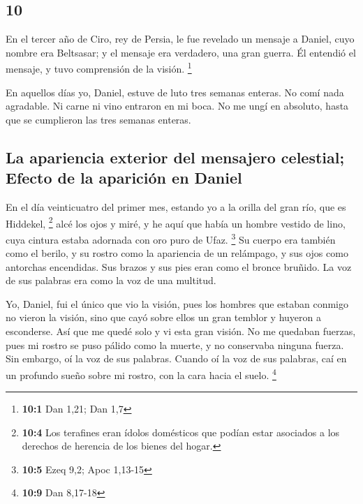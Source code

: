 \begin{paracol}{2}
\hypertarget{section-18}{%
\section{10}\label{section-18}}

 En el tercer año de Ciro, rey de Persia, le fue revelado
un mensaje a Daniel, cuyo nombre era Beltsasar; y el mensaje era
verdadero, una gran guerra. Él entendió el mensaje, y tuvo comprensión
de la visión. \footnote{\textbf{10:1} Dan 1,21; Dan 1,7}

 En aquellos días yo, Daniel, estuve de luto tres semanas
enteras.  No comí nada agradable. Ni carne ni vino
entraron en mi boca. No me ungí en absoluto, hasta que se cumplieron las
tres semanas enteras.

\hypertarget{la-apariencia-exterior-del-mensajero-celestial-efecto-de-la-apariciuxf3n-en-daniel}{%
\subsection{La apariencia exterior del mensajero celestial; Efecto de la
aparición en
Daniel}\label{la-apariencia-exterior-del-mensajero-celestial-efecto-de-la-apariciuxf3n-en-daniel}}

 En el día veinticuatro del primer mes, estando yo a la
orilla del gran río, que es Hiddekel, \footnote{\textbf{10:4} Los
  terafines eran ídolos domésticos que podían estar asociados a los
  derechos de herencia de los bienes del hogar.}  alcé los
ojos y miré, y he aquí que había un hombre vestido de lino, cuya cintura
estaba adornada con oro puro de Ufaz. \footnote{\textbf{10:5} Ezeq 9,2;
  Apoc 1,13-15}  Su cuerpo era también como el berilo, y
su rostro como la apariencia de un relámpago, y sus ojos como antorchas
encendidas. Sus brazos y sus pies eran como el bronce bruñido. La voz de
sus palabras era como la voz de una multitud.

 Yo, Daniel, fui el único que vio la visión, pues los
hombres que estaban conmigo no vieron la visión, sino que cayó sobre
ellos un gran temblor y huyeron a esconderse.  Así que me
quedé solo y vi esta gran visión. No me quedaban fuerzas, pues mi rostro
se puso pálido como la muerte, y no conservaba ninguna fuerza.
 Sin embargo, oí la voz de sus palabras. Cuando oí la voz
de sus palabras, caí en un profundo sueño sobre mi rostro, con la cara
hacia el suelo. \footnote{\textbf{10:9} Dan 8,17-18}


\end{paracol}
